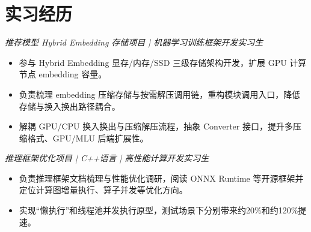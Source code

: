 
\section{实习经历}
\textit{推荐模型 Hybrid Embedding 存储项目 | 机器学习训练框架开发实习生}
\begin{itemize}
  \item 参与 Hybrid Embedding 显存/内存/SSD 三级存储架构开发，扩展 GPU 计算节点 embedding 容量。
  \item 负责梳理 embedding 压缩存储与按需解压调用链，重构模块调用入口，降低存储与换入换出路径耦合。
  \item 解耦 GPU/CPU 换入换出与压缩解压流程，抽象 Converter 接口，提升多压缩格式、GPU/MLU 后端扩展性。
\end{itemize}
\textit{推理框架优化项目 | C++语言 | 高性能计算开发实习生}
\begin{itemize}
  \item 负责推理框架文档梳理与性能优化调研，阅读 ONNX Runtime 等开源框架并定位计算图增量执行、算子并发等优化方向。
  \item 实现“懒执行”和线程池并发执行原型，测试场景下分别带来约20\%和约120\%提速。
\end{itemize}
